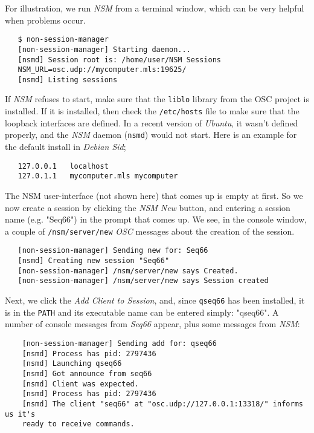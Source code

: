    For illustration, we run \textsl{NSM} from a terminal window, which can be
   very helpful when problems occur.

\begin{verbatim}
   $ non-session-manager
   [non-session-manager] Starting daemon...
   [nsmd] Session root is: /home/user/NSM Sessions
   NSM_URL=osc.udp://mycomputer.mls:19625/
   [nsmd] Listing sessions
\end{verbatim}

   If \textsl{NSM} refuses to start, make sure that the \texttt{liblo} library
   from the OSC project is installed.  If it is installed, then check the
   \texttt{/etc/hosts} file to make sure that the loopback interfaces are
   defined. In a recent version of \textsl{Ubuntu}, it wasn't defined properly,
   and the \textsl{NSM} daemon (\texttt{nsmd}) would not start.
   Here is an example for the default install in \textsl{Debian Sid};

\begin{verbatim}
   127.0.0.1   localhost
   127.0.1.1   mycomputer.mls mycomputer
\end{verbatim}

   The NSM user-interface (not shown here) that comes up is empty at first.  So
   we now create a session by clicking the \textsl{NSM}
   \textsl{New} button, and entering a session name (e.g. "Seq66") in the
   prompt that comes up.  We see, in the console window, a couple of 
   \texttt{/nsm/server/new} \textsl{OSC} messages
   about the creation of the session.

\begin{verbatim}
   [non-session-manager] Sending new for: Seq66
   [nsmd] Creating new session "Seq66"
   [non-session-manager] /nsm/server/new says Created.
   [non-session-manager] /nsm/server/new says Session created
\end{verbatim}

   Next, we click the \textsl{Add Client to Session}, and, since
   \texttt{qseq66} has been installed, it is in the \texttt{PATH}
   and its executable name can be entered simply: "qseq66".
   A number of console messages from
   \textsl{Seq66} appear, plus some messages from \textsl{NSM}:

\begin{verbatim}
	[non-session-manager] Sending add for: qseq66
	[nsmd] Process has pid: 2797436
	[nsmd] Launching qseq66
	[nsmd] Got announce from seq66
	[nsmd] Client was expected.
	[nsmd] Process has pid: 2797436
	[nsmd] The client "seq66" at "osc.udp://127.0.0.1:13318/" informs us it's
    ready to receive commands.
\end{verbatim}

